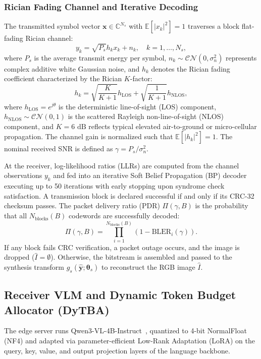 \subsubsection{Rician Fading Channel and Iterative Decoding}
The transmitted symbol vector $\mathbf{x} \in \mathbb{C}^{N_s}$ with $\mathbb{E}[|x_k|^2] = 1$ traverses a block flat-fading Rician channel:
\begin{equation}\label{eq:channel_model}
y_k = \sqrt{P_s} h_k x_k + n_k, \quad k = 1, \dots, N_s,
\end{equation}
where $P_s$ is the average transmit energy per symbol, $n_k \sim \mathcal{CN}(0, \sigma_n^2)$ represents complex additive white Gaussian noise, and $h_k$ denotes the Rician fading coefficient characterized by the Rician $K$-factor:
\begin{equation}
h_k = \sqrt{\frac{K}{K+1}} h_{\mathrm{LOS}} + \sqrt{\frac{1}{K+1}} h_{\mathrm{NLOS}},
\end{equation}
where $h_{\mathrm{LOS}} = e^{j\theta}$ is the deterministic line-of-sight (LOS) component, $h_{\mathrm{NLOS}} \sim \mathcal{CN}(0, 1)$ is the scattered Rayleigh non-line-of-sight (NLOS) component, and $K = 6\text{ dB}$ reflects typical elevated air-to-ground or micro-cellular propagation. The channel gain is normalized such that $\mathbb{E}[|h_k|^2] = 1$. The nominal received SNR is defined as $\gamma = P_s / \sigma_n^2$.

At the receiver, log-likelihood ratios (LLRs) are computed from the channel observations $y_k$ and fed into an iterative Soft Belief Propagation (BP) decoder executing up to 50 iterations with early stopping upon syndrome check satisfaction. A transmission block is declared successful if and only if its CRC-32 checksum passes. The packet delivery ratio (PDR) $\Pi(\gamma, B)$ is the probability that all $N_{\mathrm{blocks}}(B)$ codewords are successfully decoded:
\begin{equation}
\Pi(\gamma, B) = \prod_{i=1}^{N_{\mathrm{blocks}}(B)} \left(1 - \mathrm{BLER}_i(\gamma)\right).
\end{equation}
If any block fails CRC verification, a packet outage occurs, and the image is dropped ($\hat{I} = \emptyset$). Otherwise, the bitstream is assembled and passed to the synthesis transform $g_s(\mathbf{\hat y}; \boldsymbol{\theta}_s)$ to reconstruct the RGB image $\hat{I}$.

\subsection{Receiver VLM and Dynamic Token Budget Allocator (DyTBA)}
The edge server runs Qwen3-VL-4B-Instruct~\cite{wang2024qwen2vl,bai2025qwen25vl}, quantized to 4-bit NormalFloat (NF4) and adapted via parameter-efficient Low-Rank Adaptation (LoRA) on the query, key, value, and output projection layers of the language backbone.

